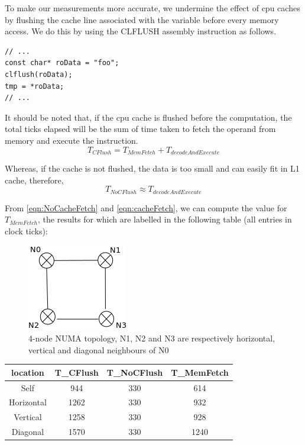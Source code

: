 To make our measurements more accurate, we undermine the effect of cpu caches by flushing the cache line associated with the 
variable before every memory access. We do this by using the CLFLUSH\cite{clflush} assembly instruction as follows.


\begin{verbatim}
// ...
const char* roData = "foo";
clflush(roData);
tmp = *roData;
// ...
\end{verbatim}

It should be noted that, if the cpu cache is flushed before the computation, the total ticks elapsed will be the sum of time 
taken to fetch the operand from memory and execute the instruction.
\begin{dmath}
\label{eqn:NoCacheFetch}
T_{CFlush} = T_{MemFetch} + T_{decodeAndExecute}
\end{dmath}

Whereas, if the cache is not flushed, the data is too small and can easily fit in L1 cache, therefore, 
\begin{dmath}
\label{eqn:cacheFetch}
T_{NoCFlush} \approx T_{decodeAndExecute}
\end{dmath}

From \ref{eqn:NoCacheFetch} and \ref{eqn:cacheFetch}, we can compute the value for $T_{MemFetch}$, the
results for which are labelled in the following table (all entries in clock ticks):

\begin{figure}
    \centering
    \includegraphics[scale=0.38]{hypercube.png}
    \caption{4-node NUMA topology, N1, N2 and N3 are respectively horizontal, vertical and diagonal neighbours of N0}
    \label{fig:remoteVsLocal}
\end{figure}


\begin{center}
\begin{tabular}{c|c|c|c}
\hline
location & T_{CFlush} & T_{NoCFlush} & T_{MemFetch}\\
\hline
Self & 944 & 330 & 614\\
Horizontal & 1262 & 330 & 932 \\
Vertical & 1258 & 330 & 928\\
Diagonal & 1570 & 330 & 1240\\
\hline
\end{tabular}
\end{center}

